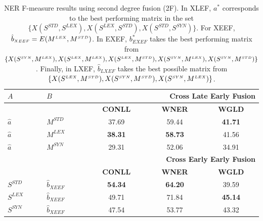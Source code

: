 \begin{table}[t!]
\centering

\caption{NER F-measure results using second degree fusion (2F). In XLEF, ${a^*}$ corresponds to the best performing matrix in the set $\{ X(S^{\scriptscriptstyle STD}, S^{\scriptscriptstyle LEX}),X(S^{\scriptscriptstyle LEX}, S^{\scriptscriptstyle STD}), \allowbreak X(S^{\scriptscriptstyle STD}, S^{\scriptscriptstyle SYN})\}$. For XEEF,  $\hat{b}_{\scriptscriptstyle XEEF}=E(M^{\scriptscriptstyle LEX}, M^{\scriptscriptstyle STD})$. In EXEF, $b^*_{\scriptscriptstyle EXEF}$  takes the best performing matrix from $\{X(S^{\scriptscriptstyle SYN}, M^{\scriptscriptstyle LEX}), \allowbreak X(S^{\scriptscriptstyle LEX}, M^{\scriptscriptstyle LEX}), X(S^{\scriptscriptstyle LEX}, M^{\scriptscriptstyle STD}), \allowbreak X(S^{\scriptscriptstyle SYN}, M^{\scriptscriptstyle LEX}), X(S^{\scriptscriptstyle SYN}, M^{\scriptscriptstyle STD}) \}$. Finally, in LXEF, $\hat{b}_{\scriptscriptstyle LXEF}$ takes the best possible matrix from $\{X(S^{\scriptscriptstyle LEX}, M^{\scriptscriptstyle STD}), X(S^{\scriptscriptstyle SYN}, M^{\scriptscriptstyle STD}), \allowbreak X(S^{\scriptscriptstyle SYN}, M^{\scriptscriptstyle LEX}) \}$.}
\label{tab:ner_2d}
\begin{tabular}{@{}llccc@{}}
	\toprule
	$A$                      & $B$            & \multicolumn{3}{r}{\textbf{Cross Late Early Fusion}}  \\ \midrule
	                         &                & \textbf{CONLL} & \textbf{WNER}  &             \textbf{WGLD}             \\
	\cmidrule{3-5}
$\hat{a}$ & $M^{\scriptscriptstyle STD}$      & 37.69 & 59.44 &            \textbf{41.71}             \\
	$\hat{a}$                & $M^{\scriptscriptstyle LEX}$      & \textbf{38.31} & \textbf{58.73} &            41.56             \\
	$\hat{a}$                & $M^{\scriptscriptstyle SYN}$      & 29.31 & 52.06 &            34.91             \\ \midrule
	                         &                & \multicolumn{3}{r}{\textbf{Cross Early Early Fusion}} \\ \midrule
	                         &                & \textbf{CONLL} & \textbf{WNER}  &             \textbf{WGLD}             \\
	\cmidrule{3-5}
$S^{\scriptscriptstyle STD}$ & $\hat{b}_{\scriptscriptstyle XEEF}$          &   \textbf{54.34}    &    \textbf{64.20}   & 39.59 \\
	$S^{\scriptscriptstyle LEX}$                &$\hat{b}_{\scriptscriptstyle XEEF}$         &  49.71     &   71.84    &  \textbf{45.14}\\
	$S^{\scriptscriptstyle SYN}$                & $\hat{b}_{\scriptscriptstyle XEEF}$         &  47.54     &   53.77    & 43.32 \\ \midrule

\end{tabular}
\end{table}
